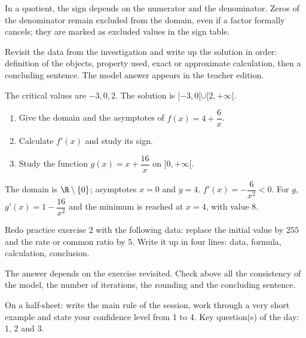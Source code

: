 \begin{summary}In a quotient, the sign depends on the numerator and the denominator. Zeros of the denominator remain excluded from the domain, even if a factor formally cancels; they are marked as excluded values in the sign table.\end{summary}

\begin{example}
Revisit the data from the investigation and write up the solution in order: definition of the objects, property used, exact or approximate calculation, then a concluding sentence. The model answer appears in the teacher edition.
\end{example}
\begin{solution}The critical values are $-3,0,2$. The solution is $[-3,0[\cup[2,+\infty[$.\end{solution}

\begin{exercise}[essential]
\begin{enumerate}\item Give the domain and the asymptotes of $f(x)=4+\dfrac{6}x$.\item Calculate $f'(x)$ and study its sign.\item Study the function $g(x)=x+\dfrac{16}x$ on $]0,+\infty[$.\end{enumerate}
\end{exercise}
\begin{solution}The domain is $\R\setminus\{0\}$; asymptotes $x=0$ and $y=4$. $f'(x)=-\dfrac{6}{x^2}<0$. For $g$, $g'(x)=1-\dfrac{16}{x^2}$ and the minimum is reached at $x=4$, with value $8$.\end{solution}


\begin{homework}Redo practice exercise 2 with the following data: replace the initial value by $255$ and the rate or common ratio by $5$. Write it up in four lines: data, formula, calculation, conclusion.\end{homework}
\begin{solution}The answer depends on the exercise revisited. Check above all the consistency of the model, the number of iterations, the rounding and the concluding sentence.\end{solution}

\begin{exitticket}[3 minutes]On a half-sheet: write the main rule of the session, work through a very short example and state your confidence level from 1 to 4. Key question(s) of the day: 1, 2 and 3.\end{exitticket}

